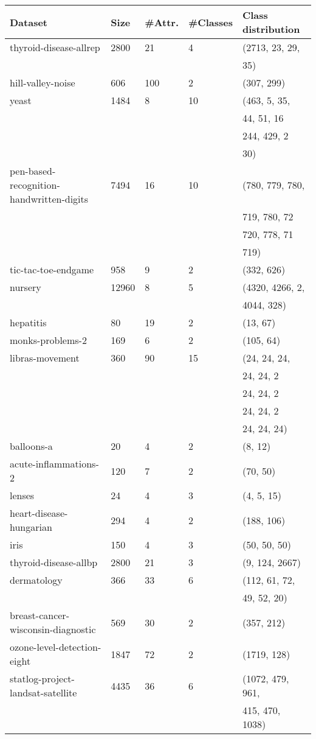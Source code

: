 \documentclass{article}%
\begin{document}
%
\normalsize%
\begin{longtable}{l l l l l}%
\hline%
Dataset&Size&\#Attr.&\#Classes&Class distribution\\%
\hline%
\hline%
thyroid{-}disease{-}allrep&2800&21&4&(2713, 23, 29,\\%
&&&&35)\\%
hill{-}valley{-}noise&606&100&2&(307, 299)\\%
yeast&1484&8&10&(463, 5, 35,\\%
&&&&44, 51, 16\\%
&&&&244, 429, 2\\%
&&&&30)\\%
pen{-}based{-}recognition{-}handwritten{-}digits&7494&16&10&(780, 779, 780,\\%
&&&&719, 780, 72\\%
&&&&720, 778, 71\\%
&&&&719)\\%
tic{-}tac{-}toe{-}endgame&958&9&2&(332, 626)\\%
nursery&12960&8&5&(4320, 4266, 2,\\%
&&&&4044, 328)\\%
hepatitis&80&19&2&(13, 67)\\%
monks{-}problems{-}2&169&6&2&(105, 64)\\%
libras{-}movement&360&90&15&(24, 24, 24,\\%
&&&&24, 24, 2\\%
&&&&24, 24, 2\\%
&&&&24, 24, 2\\%
&&&&24, 24, 24)\\%
balloons{-}a&20&4&2&(8, 12)\\%
acute{-}inflammations{-}2&120&7&2&(70, 50)\\%
lenses&24&4&3&(4, 5, 15)\\%
heart{-}disease{-}hungarian&294&4&2&(188, 106)\\%
iris&150&4&3&(50, 50, 50)\\%
thyroid{-}disease{-}allbp&2800&21&3&(9, 124, 2667)\\%
dermatology&366&33&6&(112, 61, 72,\\%
&&&&49, 52, 20)\\%
breast{-}cancer{-}wisconsin{-}diagnostic&569&30&2&(357, 212)\\%
ozone{-}level{-}detection{-}eight&1847&72&2&(1719, 128)\\%
statlog{-}project{-}landsat{-}satellite&4435&36&6&(1072, 479, 961,\\%
&&&&415, 470, 1038)\\%

\end{longtable}
\end{document}
